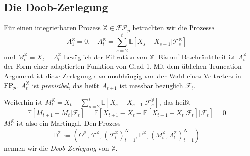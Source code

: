 \subsection{Die Doob-Zerlegung}
Für einen integrierbaren Prozess $\mathbb{X} \in \mathcal{FP}_p$ betrachten wir die Prozesse 
$$A_1^\mathbb{X}=0, \quad A_t^\mathbb{X} = \sum_{s=2}^{t} \mathbb{E}\left[ X_{s} - X_{s-1} \vert \mathcal{F}_s^\mathbb{X}\right]$$
und $M_t^\mathbb{X} = X_t - A_t^\mathbb{X}$ bezüglich der Filtration von $\mathbb{X}$. Bis auf Beschränktheit ist $A_t^\mathbb{X}$ der Form einer adaptierten Funktion von Grad 1. Mit dem üblichen Truncation-Argument ist diese Zerlegung also unabhängig von der Wahl eines Vertreters in $\operatorname{FP}_p$. $A_t^\mathbb{X}$ ist \emph{previsibel}, das heißt $A_{t+1}$ ist messbar bezüglich $\mathcal{F}_t$. 

Weiterhin ist $M_t^\mathbb{X} = X_t - \sum_{s=2}^{t}\mathbb{E}[X_s - X_{s-1} \vert \mathcal{F}_s^\mathbb{X}]$, das heißt 
$$\mathbb{E}\left[ M_{t+1} - M_t \vert \mathcal{F}_t\right] = \mathbb{E}\left[ X_{t+1} - X_t - \mathbb{E}[X_{t+1} - X_t \vert \mathcal{F}_t] \vert \mathcal{F}_t \right] = 0$$
$M_t^\mathbb{X}$ ist also ein Martingal. Den Prozess 
$$\mathbb{D}^\mathbb{X} := \left( \Omega^\mathbb{X}, \mathcal{F}^\mathbb{X}, \left( \mathcal{F}_t^\mathbb{X}\right)_{t=1}^N, \mathbb{P}^\mathbb{X}, (M_t^\mathbb{X}, A_t^\mathbb{X})_{t=1}^N \right)$$
nennen wir die \emph{Doob-Zerlegung} von $\mathbb{X}$. 

